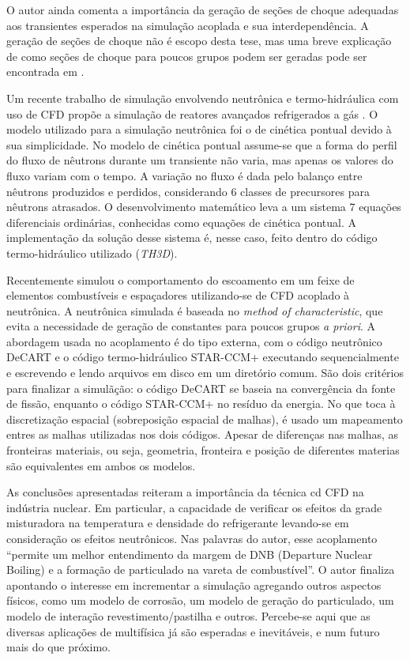 O autor ainda comenta a importância da geração de seções de choque adequadas aos transientes esperados na 
simulação acoplada e sua interdependência. A geração de seções de choque não é escopo desta tese, mas uma 
breve explicação de como seções de choque para poucos grupos podem ser geradas pode ser encontrada 
em \cite{Friedman2013}.

Um recente trabalho de simulação envolvendo neutrônica e termo-hidráulica com uso de CFD propõe 
a simulação de reatores avançados refrigerados a gás \cite{Hossain2011}. O modelo utilizado 
para a simulação neutrônica foi o de cinética pontual devido à sua simplicidade. No modelo 
de cinética pontual assume-se que a forma do perfil do fluxo de nêutrons durante um transiente 
não varia, mas apenas os valores do fluxo variam com o tempo. A variação no fluxo é dada 
pelo balanço entre nêutrons produzidos e perdidos, considerando 6 classes de precursores 
para nêutrons atrasados. O desenvolvimento matemático leva a um sistema 7 equações diferenciais 
ordinárias, conhecidas como equações de cinética pontual. A implementação da solução desse sistema 
é, nesse caso, feito dentro do código termo-hidráulico utilizado (\textit{TH3D}).

Recentemente \cite{Yan2011} simulou o comportamento do escoamento em um feixe de elementos 
combustíveis e espaçadores utilizando-se de CFD acoplado à neutrônica. A neutrônica 
simulada é baseada no \textit{method of characteristic}, que evita a necessidade de geração 
de constantes para poucos grupos \textit{a priori}. A abordagem usada no 
acoplamento é do tipo externa, com o código neutrônico DeCART e o código termo-hidráulico 
STAR-CCM+ executando sequencialmente e escrevendo e lendo arquivos em disco em um 
diretório comum. São dois critérios para finalizar a simulãção: o código DeCART se baseia 
na convergência da fonte de fissão, enquanto o código STAR-CCM+ no resíduo da energia. No que toca à 
discretização espacial (sobreposição espacial de malhas), é usado um mapeamento entres as malhas 
utilizadas nos dois códigos. Apesar de diferenças nas malhas, as fronteiras materiais, ou seja, geometria, 
fronteira e posição de diferentes materias são equivalentes em ambos os modelos.

As conclusões apresentadas reiteram a importância da técnica cd CFD na indústria nuclear. Em particular, 
a capacidade de verificar os efeitos da grade misturadora na temperatura e densidade do refrigerante 
levando-se em consideração os efeitos neutrônicos. Nas palavras do autor, esse acoplamento 
``permite um melhor entendimento da margem de DNB (Departure Nuclear Boiling) e a formação de particulado 
na vareta de combustível''. O autor finaliza apontando o interesse em incrementar a simulação 
agregando outros aspectos físicos, como um modelo de corrosão, um modelo de geração do particulado, 
um modelo de interação revestimento/pastilha e outros. Percebe-se aqui que as diversas aplicações 
de multifísica já são esperadas e inevitáveis, e num futuro mais do que próximo.

